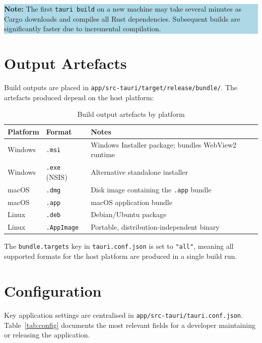 \documentclass[12pt, a4paper]{report}
\newcommand{\infobox}[1]{%
	\vspace{6pt}
	\noindent
	\colorbox{LightBlue}{%
		\begin{minipage}{\dimexpr\linewidth-2\fboxsep}%
			\vspace{4pt}
			\small #1
			\vspace{4pt}
		\end{minipage}%
	}
	\vspace{6pt}
}
\begin{document}
	\infobox{\textbf{Note:} The first \texttt{tauri build} on a new machine may
		take several minutes as Cargo downloads and compiles all Rust dependencies.
		Subsequent builds are significantly faster due to incremental compilation.}

	\section{Output Artefacts}
	Build outputs are placed in \texttt{app/src-tauri/target/release/bundle/}.
	The artefacts produced depend on the host platform:

	\begin{table}[H]
		\centering
		\begin{tabularx}{\textwidth}{l l X}
			\toprule
			\textbf{Platform} & \textbf{Format}        & \textbf{Notes} \\
			\midrule
			Windows           & \texttt{.msi}           & Windows Installer package; bundles WebView2 runtime \\
			Windows           & \texttt{.exe} (NSIS)    & Alternative standalone installer \\
			macOS             & \texttt{.dmg}           & Disk image containing the \texttt{.app} bundle \\
			macOS             & \texttt{.app}           & macOS application bundle \\
			Linux             & \texttt{.deb}           & Debian/Ubuntu package \\
			Linux             & \texttt{.AppImage}      & Portable, distribution-independent binary \\
			\bottomrule
		\end{tabularx}
		\caption{Build output artefacts by platform}
		\label{tab:artefacts}
	\end{table}

	The \texttt{bundle.targets} key in \texttt{tauri.conf.json} is set to
	\texttt{"all"}, meaning all supported formats for the host platform are
	produced in a single build run.

	\section{Configuration}
	Key application settings are centralised in
	\texttt{app/src-tauri/tauri.conf.json}. Table~\ref{tab:config} documents
	the most relevant fields for a developer maintaining or releasing the
	application.
\end{document}
